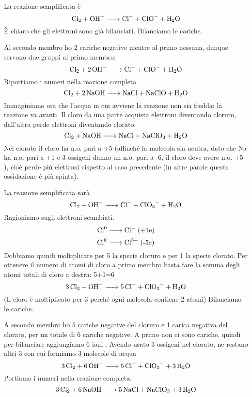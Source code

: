 La reazione semplificata è
$$\ce{Cl_2 + OH- -> Cl- + ClO- + H_2O}$$
È chiaro che gli elettroni sono già bilanciati. Bilanciamo le cariche.

Al secondo membro ho 2 cariche negative mentre al primo nessuna, dunque servono due gruppi  al primo membro:
$$\ce{Cl_2 + 2OH- -> Cl- + ClO- + H_2O}$$
Riportiamo i numeri nella reazione completa
$$\ce{Cl_2 + 2NaOH -> NaCl + NaClO + H_2O}$$
Immaginiamo ora che l'acqua in cui avviene la reazione non sia fredda: la reazione va avanti. Il cloro da una parte acquista elettroni diventando cloruro, dall'altra perde elettroni diventando clorato:
$$\ce{Cl_2 + NaOH -> NaCl + NaClO_3 + H_2O}$$
Nel clorato il cloro ha n.o. pari a +5 (affinché la molecola  sia neutra, dato che Na ha n.o. pari a +1 e 3 ossigeni danno un n.o. pari a -6, il cloro deve avere n.o. +5 ), cioè perde più elettroni rispetto al caso precedente (in altre parole questa ossidazione è più spinta).

La reazione semplificata sarà
$$\ce{Cl_2 + OH- -> Cl- + ClO_3- + H_2O}$$
Ragioniamo sugli elettroni scambiati.
$$\ce{Cl^0 ->Cl-} \; \text{(+1e)}$$
$$\ce{Cl^0 ->Cl^5+} \; \text{(-5e)}$$
Dobbiamo quindi moltiplicare per 5 la specie cloruro e per 1 la specie clorato. Per ottenere il numero di atomi di cloro a primo membro basta fare la somma degli atomi totali di cloro a destra: 5+1=6
$$\ce{3Cl_2 + OH- -> 5Cl- + ClO_3- + H_2O}$$
(Il cloro è moltiplicato per 3 perché ogni molecola contiene 2 atomi)
Bilanciamo le cariche.

A secondo membro ho 5 cariche negative del cloruro e 1 carica negativa del clorato, per un totale di 6 cariche negative. A primo non ci sono cariche, quindi per bilanciare aggiungiamo 6 ioni . Avendo usato 3 ossigeni nel clorato, ne restano altri 3 con cui formiamo 3 molecole di acqua
$$\ce{3Cl_2 + 6OH- -> 5Cl- + ClO_3- + 3H_2O}$$
Portiamo i numeri nella reazione completa:
$$\ce{3Cl_2 + 6NaOH -> 5NaCl + NaClO_3 + 3H_2O}$$